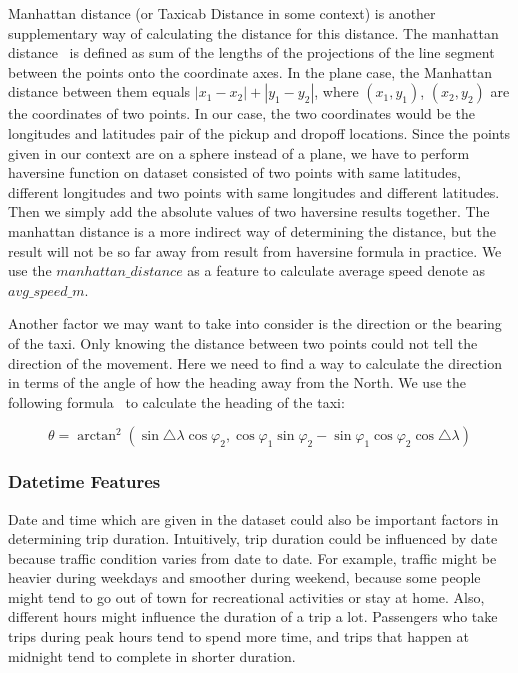 Manhattan distance (or Taxicab Distance in some context) is another supplementary way of calculating the distance for this distance. The manhattan distance~\cite{wiki:Taxicab_geometry} is defined as sum of the lengths of the projections of the line segment between the points onto the coordinate axes. In the plane case, the Manhattan distance between them equals $|x_1-x_2|+|y_1-y_2|$, where $(x_1, y_1)$, $(x_2, y_2)$ are the coordinates of two points. In our case, the two coordinates would be the longitudes and latitudes pair of the pickup and dropoff locations. Since the points given in our context are on a sphere instead of a plane, we have to perform haversine function on dataset consisted of two points with same latitudes, different longitudes and two points with same longitudes and different latitudes. Then we simply add the absolute values of two haversine results together. The manhattan distance is a more indirect way of determining the distance, but the result will not be so far away from result from haversine formula in practice. We use the $manhattan\_distance$ as a feature to calculate average speed denote as $avg\_speed\_m$. 

Another factor we may want to take into consider is the direction or the bearing of the taxi. Only knowing the distance between two points could not tell the direction of the movement. Here we need to find a way to calculate the direction in terms of the angle of how the heading away from the North. We use the following formula~\cite{scripts2013calculate} to calculate the heading of the taxi: 

\begin{equation}
\theta = \arctan^2(\sin \triangle\lambda \cos \varphi_2, \cos \varphi_1 \sin \varphi_2-\sin \varphi_1 \cos \varphi_2 \cos\triangle \lambda)
\end{equation}

\subsubsection{Datetime Features}
Date and time  which are given in the dataset could also be important factors in determining trip duration. Intuitively, trip duration could be influenced by date because traffic condition varies from date to date. For example, traffic might be heavier during weekdays and smoother during weekend, because some people might tend to go out of town for recreational activities or stay at home. Also, different hours might influence the duration of a trip a lot. Passengers who take trips during peak hours tend to spend more time, and trips that happen at midnight tend to complete in shorter duration. 

